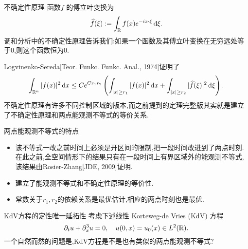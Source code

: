 \begin{frame}[t]{不确定性原理}
  函数$f$ 的傅立叶变换为
  \begin{equation}
    \widehat{f}(\xi):=\int_{\mathbb{R}} f(x)e^{-ix\cdot \xi}\,\mathrm{d}\xi.
  \end{equation}
  调和分析中的不确定性原理告诉我们:如果一个函数及其傅立叶变换在无穷远处等于$0$,则这个函数恒为$0$.


  Logvinenko-Sereda[Teor. Funkc. Funkc. Anal., 1974]证明了
 \begin{equation}\label{unc}
   \int_{\mathbb{R}^{n}}|f(x)|^2\,\mathrm{d}x\le C e^{Cr_1r_2}\left( \int_{|x|\ge r_1}|f(x)|^2\,\mathrm{d}x+\int_{|x|\ge r_2}|\widehat{f}(\xi)|^2\,\mathrm{d}\xi \right).
 \end{equation}
 不确定性原理有许多不同控制区域的版本,而之前提到的定理完整版其实就是建立了不确定性原理和两点能观测不等式的等价关系.
\end{frame}

\begin{frame}[t]{两点能观测不等式的特点}
  \begin{itemize}
    \item 该不等式一改之前时间上必须是开区间的限制,把一段时间改进到了两点时刻.在此之前,全空间情形下的结果只有在一段时间上有界区域外的能观测不等式,该结果由Rosier-Zhang[JDE, 2009]证明.
    \item 建立了能观测不等式和不确定性原理的等价性.
    \item 常数关于$r_1,r_2$的依赖关系是最优估计,相应的两点时刻也是最优.
  \end{itemize}
\end{frame}


\begin{frame}[t]{KdV方程的定性唯一延拓性}
  考虑下述线性 Korteweg-de Vries (KdV) 方程
  \begin{equation}\label{kdv}
    \partial_t u +\partial_x^3u=0,\quad u(0,x)=u_0(x)\in L^2(\mathbb{R}).
  \end{equation}
一个自然而然的问题是,KdV方程是不是也有类似的两点能观测不等式?
\end{frame}

